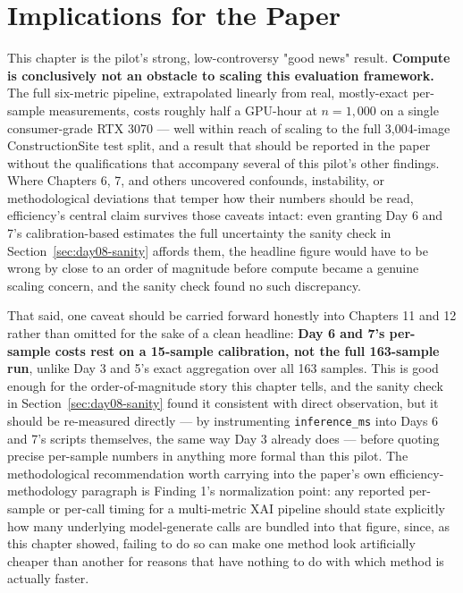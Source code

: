 \section{Implications for the Paper}

This chapter is the pilot's strong, low-controversy "good news" result. \textbf{Compute is
conclusively not an obstacle to scaling this evaluation framework.} The full six-metric pipeline,
extrapolated linearly from real, mostly-exact per-sample measurements, costs roughly half a GPU-hour
at $n=1{,}000$ on a single consumer-grade RTX 3070 --- well within reach of scaling to the full
3,004-image ConstructionSite test split, and a result that should be reported in the paper without
the qualifications that accompany several of this pilot's other findings. Where Chapters 6, 7, and
others uncovered confounds, instability, or methodological deviations that temper how their numbers
should be read, efficiency's central claim survives those caveats intact: even granting Day 6 and
7's calibration-based estimates the full uncertainty the sanity check in
Section~\ref{sec:day08-sanity} affords them, the headline figure would have to be wrong by close to an
order of magnitude before compute became a genuine scaling concern, and the sanity check found no
such discrepancy.

That said, one caveat should be carried forward honestly into Chapters 11 and 12 rather than
omitted for the sake of a clean headline: \textbf{Day 6 and 7's per-sample costs rest on a
15-sample calibration, not the full 163-sample run}, unlike Day 3 and 5's exact aggregation over all
163 samples. This is good enough for the order-of-magnitude story this chapter tells, and the
sanity check in Section~\ref{sec:day08-sanity} found it consistent with direct observation, but it
should be re-measured directly --- by instrumenting \texttt{inference\_ms} into Days 6 and 7's
scripts themselves, the same way Day 3 already does --- before quoting precise per-sample numbers
in anything more formal than this pilot. The methodological recommendation worth carrying into the
paper's own efficiency-methodology paragraph is Finding 1's normalization point: any reported
per-sample or per-call timing for a multi-metric XAI pipeline should state explicitly how many
underlying model-generate calls are bundled into that figure, since, as this chapter showed, failing
to do so can make one method look artificially cheaper than another for reasons that have nothing to
do with which method is actually faster.
